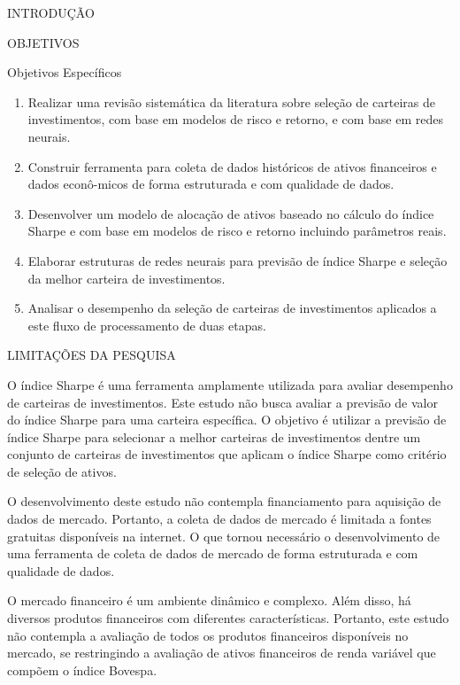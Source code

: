 \begin{section}{INTRODUÇÃO}
\begin{subsection}{OBJETIVOS}
        \begin{subsubsection}{Objetivos Específicos}
            \begin{enumerate}
                \item Realizar uma revisão sistemática da literatura sobre seleção de carteiras de investimentos, com base em modelos de risco e retorno, e com base em redes neurais.
                \item Construir ferramenta para coleta de dados históricos de ativos financeiros e dados econô-micos de forma estruturada e com qualidade de dados.
                \item Desenvolver um modelo de alocação de ativos baseado no cálculo do índice Sharpe e com base em modelos de risco e retorno incluindo parâmetros reais.
                \item Elaborar estruturas de redes neurais para previsão de índice Sharpe e seleção da melhor carteira de investimentos.
                \item Analisar o desempenho da seleção de carteiras de investimentos aplicados a este fluxo de processamento de duas etapas. 
            \end{enumerate}

        \end{subsubsection}

    \end{subsection}

    
    \begin{subsection}{LIMITAÇÕES DA PESQUISA}
    
        \ipar O índice Sharpe é uma ferramenta amplamente utilizada para avaliar desempenho de carteiras de investimentos. Este estudo não busca avaliar a previsão de valor do índice Sharpe para uma carteira específica. O objetivo é utilizar a previsão de índice Sharpe para selecionar a melhor carteiras de investimentos dentre um conjunto de carteiras de investimentos que aplicam o índice Sharpe como critério de seleção de ativos.

        \ipar O desenvolvimento deste estudo não contempla financiamento para aquisição de dados de mercado. Portanto, a coleta de dados de mercado é limitada a fontes gratuitas disponíveis na internet. O que tornou necessário o desenvolvimento de uma ferramenta de coleta de dados de mercado de forma estruturada e com qualidade de dados.

        \ipar O mercado financeiro é um ambiente dinâmico e complexo. Além disso, há diversos produtos financeiros com diferentes características. Portanto, este estudo não contempla a avaliação de todos os produtos financeiros disponíveis no mercado, se restringindo a avaliação de ativos financeiros de renda variável que compõem o índice Bovespa.


\end{subsection}
\end{section}
